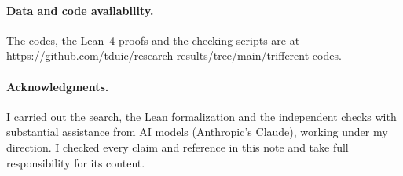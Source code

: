 \documentclass[11pt]{article}
\theoremstyle{remark}
\begin{document}
\paragraph{Data and code availability.}
The codes, the Lean~4 proofs and the checking scripts are at \url{https://github.com/tduic/research-results/tree/main/trifferent-codes}.

\paragraph{Acknowledgments.}
I carried out the search, the Lean formalization and the independent checks with substantial assistance from AI models (Anthropic's Claude), working under my direction. I checked every claim and reference in this note and take full responsibility for its content.



\end{document}
